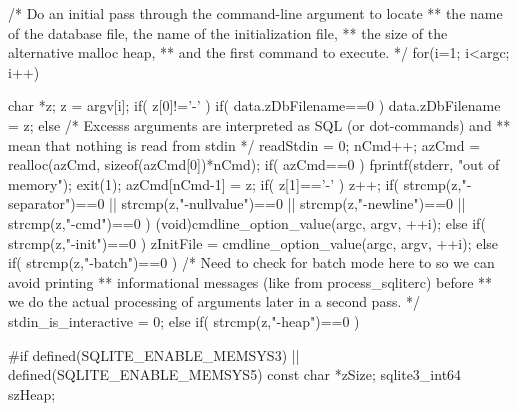 \begin{Codex}[label=shell.c,numbers=left]
{  /* Do an initial pass through the command-line argument to locate
  ** the name of the database file, the name of the initialization file,
  ** the size of the alternative malloc heap,
  ** and the first command to execute.
  */
  for(i=1; i<argc; i++){
    char *z;
    z = argv[i];
    if( z[0]!='-' ){
      if( data.zDbFilename==0 ){
        data.zDbFilename = z;
      }else{
        /* Excesss arguments are interpreted as SQL (or dot-commands) and
        ** mean that nothing is read from stdin */
        readStdin = 0;
        nCmd++;
        azCmd = realloc(azCmd, sizeof(azCmd[0])*nCmd);
        if( azCmd==0 ){
          fprintf(stderr, "out of memory\n");
          exit(1);
        }
        azCmd[nCmd-1] = z;
      }
    }
    if( z[1]=='-' ) z++;
    if( strcmp(z,"-separator")==0
     || strcmp(z,"-nullvalue")==0
     || strcmp(z,"-newline")==0
     || strcmp(z,"-cmd")==0
    ){
      (void)cmdline_option_value(argc, argv, ++i);
    }else if( strcmp(z,"-init")==0 ){
      zInitFile = cmdline_option_value(argc, argv, ++i);
    }else if( strcmp(z,"-batch")==0 ){
      /* Need to check for batch mode here to so we can avoid printing
      ** informational messages (like from process_sqliterc) before 
      ** we do the actual processing of arguments later in a second pass.
      */
      stdin_is_interactive = 0;
    }else if( strcmp(z,"-heap")==0 ){
#if defined(SQLITE_ENABLE_MEMSYS3) || defined(SQLITE_ENABLE_MEMSYS5)
      const char *zSize;
      sqlite3_int64 szHeap;

}}}
\end{Codex}
